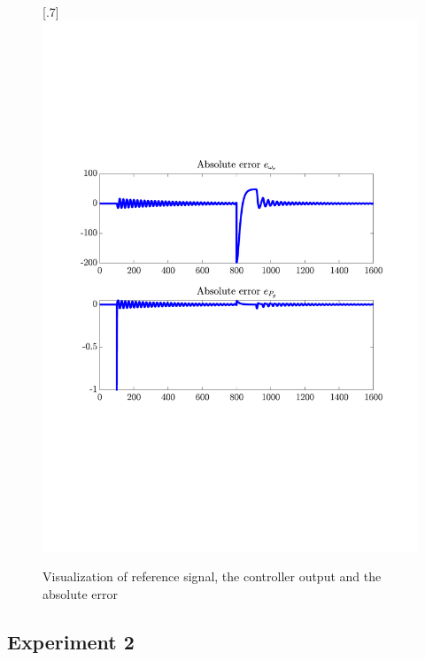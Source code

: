 \begin{figure}[H]
[.7\textwidth]{\includegraphics[width=1\linewidth, scale=1, trim=55 230 55 120,clip]{fig/Open_loop/exp_1_error.pdf}}
    \caption{Visualization of reference signal, the controller output and the absolute error}
    \label{fig:app:cl_results:exp1}
\end{figure}




\subsection{Experiment 2}

